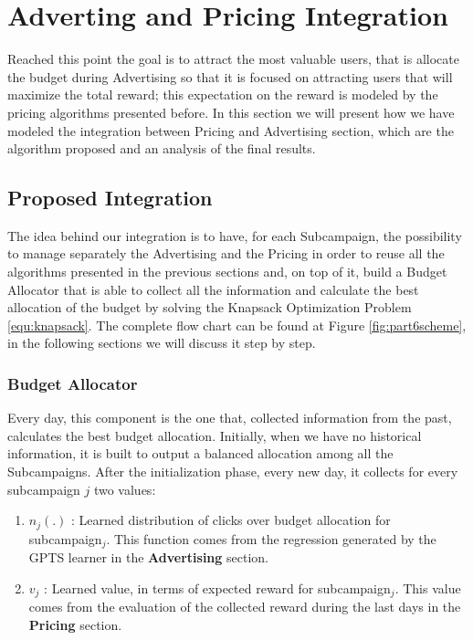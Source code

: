 \chapter{Adverting and Pricing Integration}

\setcounter{equ}{2}

Reached this point the goal is to attract the most valuable users, that is allocate the budget during Advertising so that it is focused on attracting users that will maximize the total reward; this expectation on the reward is modeled by the pricing algorithms presented before. In this section we will present how we have modeled the integration between Pricing and Advertising section, which are the algorithm proposed and an analysis of the final results.


\section{Proposed Integration}
The idea behind our integration is to have, for each Subcampaign, the possibility to manage separately the Advertising and the Pricing in order to reuse all the algorithms presented in the previous sections and, on top of it, build a Budget Allocator that is able to collect all the information and calculate the best allocation of the budget by solving the Knapsack Optimization Problem \ref{equ:knapsack}.
The complete flow chart can be found at Figure \ref{fig:part6scheme}, in the following sections we will discuss it step by step.

\subsection{Budget Allocator}
Every day, this component is the one that, collected information from the past, calculates the best budget allocation. Initially, when we have no historical information, it is built to output a balanced allocation among all the Subcampaigns. After the initialization phase, every new day, it collects for every subcampaign $ j $ two values:

\begin{enumerate}
    \item $ n_j (.) $ : Learned distribution of clicks over budget allocation for subcampaign$_j$. This function comes from the regression generated by the GPTS learner in the   \textbf{Advertising} section.
    \item $ v_j $ : Learned value, in terms of expected reward for subcampaign$_j$. This value comes from the evaluation of the collected reward during the last days in the \textbf{Pricing} section.
\end{enumerate}

